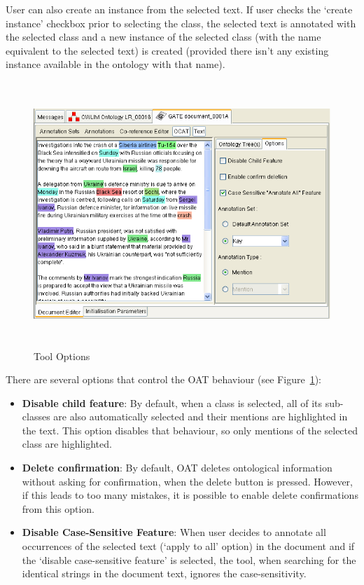 {User can also create an instance from the selected text. If user
checks the `create instance' checkbox prior to selecting the class,
the selected text is annotated with the selected class and a new
instance of the selected class (with the name equivalent to the
selected text) is created (provided there isn't any existing instance
available in the ontology with that name).


\begin{figure}
\includegraphics[height=10cm]{ontology_ocat_options.png}
\caption{Tool Options} \label{fig:ocat:options}
\end{figure}

There are several options that control the OAT behaviour (see
Figure~\ref{fig:ocat:options}):
\begin{itemize}
\item {\bf Disable child feature}: By default, when a class is
selected, all of its sub-classes are also automatically selected and
their mentions are highlighted in the text. This option disables that
behaviour, so only mentions of the selected class are highlighted.

\item {\bf Delete confirmation}: By default, OAT deletes ontological
information without asking for confirmation, when the delete button
is pressed. However, if this leads to too many mistakes, it is
possible to enable delete confirmations from this option.

\item {\bf Disable Case-Sensitive Feature}: When user decides to annotate all
occurrences of the selected text (`apply to all' option) in the
document and if the `disable case-sensitive feature' is selected,
the tool, when searching for the identical strings in the document
text, ignores the case-sensitivity.


\end{itemize}}
